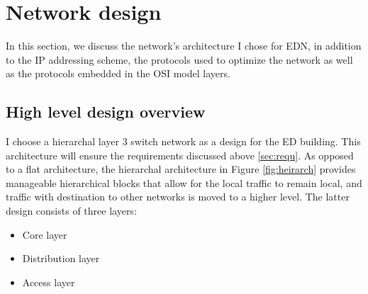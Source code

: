 \documentclass[ a4, 12pt, onecolumn]{IEEEtran}
\begin{document}
\section{Network design}
In this section, we discuss the network's architecture I chose for EDN, in addition to the IP addressing scheme, the protocols used to optimize the network as well as the protocols embedded in the OSI model layers.
\subsection{High level design overview}
I choose a hierarchal layer 3 switch network as a design for the ED building. This architecture will ensure the requirements discussed above \ref{sec:requ}. As opposed to a flat architecture, the hierarchal architecture in Figure \ref{fig:heirarch} provides manageable hierarchical blocks that allow for the local traffic to remain local, and traffic with destination to other networks is moved to a higher level. The latter design consists of three layers:

\begin{itemize}
\item Core layer
\item Distribution layer
\item Access layer
\end{itemize}
\end{document}
